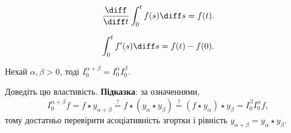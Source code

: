 \begin{proposition}
    \begin{equation}
        \frac{\diff}{\diff t} \int_0^t f(s) \diff s = f(t).
    \end{equation}
\end{proposition}

\begin{proposition}
    \begin{equation}
        \int_0^t f'(s) \diff s = f(t) - f(0).
    \end{equation}
\end{proposition}

\begin{proposition}
    Нехай $\alpha, \beta > 0$, тоді $I_0^{\alpha + \beta} = I_0^\alpha I_0^\beta$.
\end{proposition}
\begin{exercise}
    Доведіть цю властивість. \textbf{Підказка}: за означеннями,
    \begin{equation}
        I_0^{\alpha + \beta} f = f \star y_{\alpha + \beta} \overset{?}{=} f \star (y_\alpha \star y_\beta) \overset{?}{=} (f \star y_\alpha) \star y_\beta = I_0^\beta I_0^\alpha f,
    \end{equation}
    тому достатньо перевірити асоціативність згортки і рівність $y_{\alpha + \beta} = y_\alpha \star y_\beta$.
\end{exercise}
